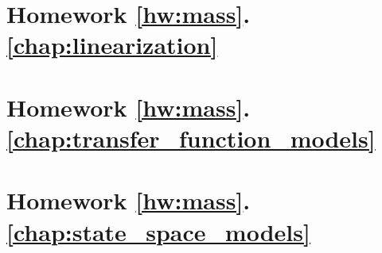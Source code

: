 %		
	\section*{
		Homework \ref{hw:mass}.\ref{chap:linearization}}  \label{hw:mass_linearization}
		
	\section*{
		Homework \ref{hw:mass}.\ref{chap:transfer_function_models}}  \label{hw:mass_transfer_function}
		
	\section*{
		Homework \ref{hw:mass}.\ref{chap:state_space_models}}  \label{hw:mass_state_space}
		
